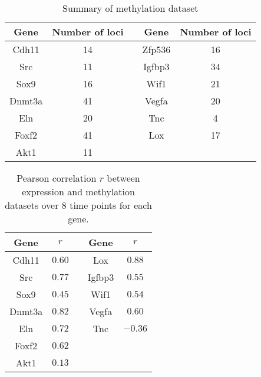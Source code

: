 \documentclass[10pt]{article}
\begin{document}
\begin{table}[ht]
\centering
\begin{tabular}{|c|c|c|c|c|}
\hline
Gene & Number of loci  & & Gene & Number of loci  \\
\hline
Cdh11 & 14 & & Zfp536 & 16 \\
\hline
Src & 11 & & Igfbp3 & 34 \\
\hline
Sox9 & 16 & & Wif1 & 21 \\
\hline
Dnmt3a & 41 & & Vegfa & 20 \\
\hline
Eln & 20 & & Tnc & 4 \\
\hline
Foxf2 & 41 & & Lox & 17 \\
\hline
Akt1 & 11 & & &  \\
\hline
\end{tabular}
\caption{Summary of methylation dataset}
\label{tab:sup1}
\end{table}

\begin{table}
\centering
\begin{tabular}{|c|c|c|c|c|}
\hline
Gene & $r$  & & Gene & $r$ \\
\hline
Cdh11 & $0.60$ & & Lox & $0.88$ \\
\hline
Src & $0.77$ & & Igfbp3 & $0.55$ \\
\hline
Sox9 & $0.45$ & & Wif1 & $0.54$ \\
\hline
Dnmt3a & $0.82$ & & Vegfa & $0.60$ \\
\hline
Eln & $0.72$ & & Tnc & $-0.36$ \\
\hline
Foxf2 & $0.62$ & & & \\
\hline
Akt1 & $0.13$ & & &  \\
\hline
\end{tabular}
\caption{Pearson correlation $r$  between expression and
  methylation datasets over $8$ time points for each gene.}
\label{tab:sup2}
\end{table}
\end{document}
